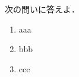 \enumSep{\narrowenumsep}
次の問いに答えよ．
\begin{enumerate}[1)]
  \item aaa
  \item bbb
  \item ccc
\end{enumerate}
